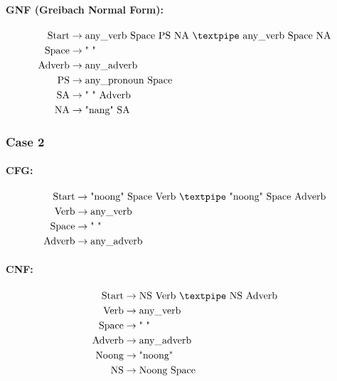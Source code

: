 \paragraph{GNF (Greibach Normal Form):}

\begin{equation*}
    \begin{aligned}
        \text{Start} &\rightarrow \text{any\_verb Space PS NA {\textpipe} any\_verb Space NA} \\
        \text{Space} &\rightarrow \text{" "} \\
        \text{Adverb} &\rightarrow \text{any\_adverb} \\
        \text{PS} &\rightarrow \text{any\_pronoun Space} \\
        \text{SA} &\rightarrow \text{" " Adverb} \\
        \text{NA} &\rightarrow \text{"nang" SA}
    \end{aligned}
\end{equation*}


\subsubsection{Case 2}

\paragraph{CFG:}

\begin{equation*}
    \begin{aligned}
        \text{Start} &\rightarrow \text{"noong" Space Verb {\textpipe} "noong" Space Adverb} \\
        \text{Verb} &\rightarrow \text{any\_verb} \\
        \text{Space} &\rightarrow \text{" "} \\
        \text{Adverb} &\rightarrow \text{any\_adverb}
    \end{aligned}
\end{equation*}

\paragraph{CNF:}

\begin{equation*}
    \begin{aligned}
        \text{Start} &\rightarrow \text{NS Verb {\textpipe} NS Adverb} \\
        \text{Verb} &\rightarrow \text{any\_verb} \\
        \text{Space} &\rightarrow \text{" "} \\
        \text{Adverb} &\rightarrow \text{any\_adverb} \\
        \text{Noong} &\rightarrow \text{"noong"} \\
        \text{NS} &\rightarrow \text{Noong Space}
    \end{aligned}
\end{equation*}

